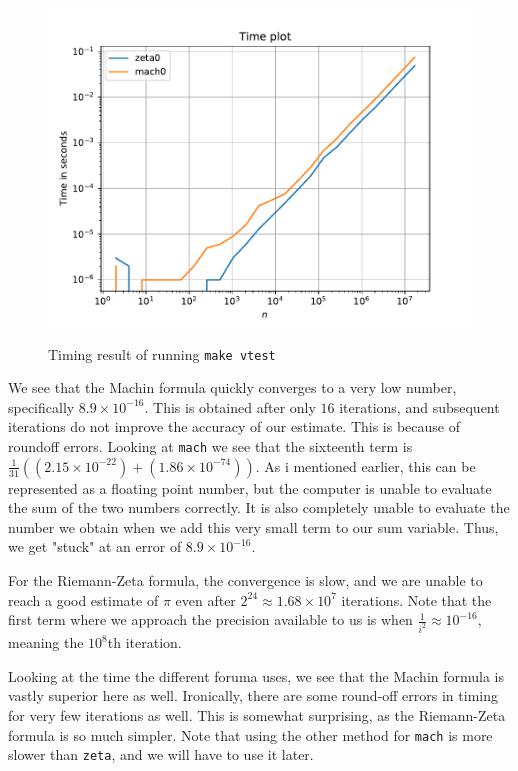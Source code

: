 \documentclass[12pt]{article}
\begin{document}
\begin{figure}[!htb]
    \centering
    \caption{Timing result of running \texttt{make vtest}}
    \includegraphics[width=\textwidth]{Time1}
    \label{fig:Time1}
\end{figure}
We see that the Machin formula quickly converges to a very low number, specifically $8.9 \times 10^{-16}$. 
This is obtained after only $16$ iterations, and subsequent iterations do not improve the accuracy of our estimate.
This is because of roundoff errors. Looking at \texttt{mach} we see that the sixteenth term is $\frac{1}{31}((2.15 \times 10^{-22}) + (1.86 \times 10^{-74}))$. 
As i mentioned earlier, this can be represented as a floating point number, but the computer is unable to evaluate the sum of the two numbers correctly.
It is also completely unable to evaluate the number we obtain when we add this very small term to our sum variable. Thus, we get "stuck" at an error of $8.9 \times 10^{-16}$.

For the Riemann-Zeta formula, the convergence is slow, and we are unable to reach a good estimate of $\pi$ even after $2^{24} \approx 1.68 \times 10^7$ iterations. Note that
the first term where we approach the precision available to us is when $\frac{1}{i^2} \approx 10^{-16}$, meaning the $10^8$th iteration. 

Looking at the time the different foruma uses, we see that the Machin formula is vastly superior here as well. Ironically, there are some round-off errors in timing for very few iterations as well.
This is somewhat surprising, as the Riemann-Zeta formula is so much simpler. Note that
using the other method for \texttt{mach} is more slower than \texttt{zeta}, and we will have to use it later.
\end{document}
